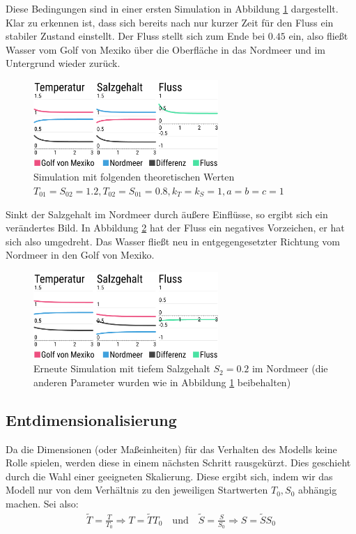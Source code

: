 \documentclass[a4paper,twoside]{article}
\begin{document}
	Diese Bedingungen sind in einer ersten Simulation in Abbildung \ref{fig:modell_q_pos}  dargestellt. Klar zu erkennen ist, dass sich bereits nach nur kurzer Zeit für den Fluss ein stabiler Zustand einstellt. Der Fluss stellt sich zum Ende bei \(0.45\) ein, also fließt Wasser vom Golf von Mexiko über die Oberfläche in das Nordmeer und im Untergrund wieder zurück.
	
	\begin{figure}[!h]
  		\centering
 		\includegraphics[width=7cm]{Grafiken/temp-salt-flow_q-pos.png}
  		\caption{Simulation mit folgenden theoretischen Werten \(T_{01} = S_{02} = 1.2, T_{02} = S_{01} = 0.8, k_T = k_S = 1, a = b = c = 1\)}
  		\label{fig:modell_q_pos}
	\end{figure}
	
	Sinkt der Salzgehalt im Nordmeer durch äußere Einflüsse, so ergibt sich ein verändertes Bild. In Abbildung \ref{fig:modell_q_neg} hat der Fluss ein negatives Vorzeichen, er hat sich also umgedreht. Das Wasser fließt neu in entgegengesetzter Richtung vom Nordmeer in den Golf von Mexiko.
	\begin{figure}[!h]
  		\centering
 		\includegraphics[width=7cm]{Grafiken/temp-salt-flow_q-neg.png}
  		\caption{Erneute Simulation mit tiefem Salzgehalt \(S_2 = 0.2\) im Nordmeer (die anderen Parameter wurden wie in Abbildung \ref{fig:modell_q_pos} beibehalten)}
  		\label{fig:modell_q_neg}
	\end{figure}
	
	\subsection{Entdimensionalisierung}
	Da die Dimensionen (oder Maßeinheiten) für das Verhalten des Modells keine Rolle spielen, werden diese in einem nächsten Schritt rausgekürzt. Dies geschieht durch die Wahl einer geeigneten Skalierung. Diese ergibt sich, indem wir das Modell nur von dem Verhältnis zu den jeweiligen Startwerten \(T_0, S_0\) abhängig machen. Sei also:
	\begin{align*}
		\tilde{T} = \frac{T}{T_0} \Rightarrow T = \tilde{T} T_0 \quad \textrm{und} \quad \tilde{S} = \frac{S}{S_0} \Rightarrow S = \tilde{S} S_0
	\end{align*}
	
\end{document}
